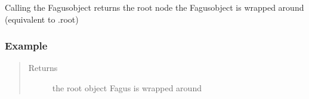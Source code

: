 \documentclass[a4paper,10pt,english]{sphinxmanual}
\begin{document}
\begin{fulllineitems}
\begin{fulllineitems}
\end{fulllineitems}


\begin{fulllineitems}
\label{\detokenize{fagus.fagus:fagus.fagus.Fagus.__call__}}
\pysigstartsignatures
{}
\pysigstopsignatures
\sphinxAtStartPar
Calling the Fagus\sphinxhyphen{}object returns the root node the Fagus\sphinxhyphen{}object is wrapped around (equivalent to .root)
\subsubsection*{Example}

\begin{sphinxVerbatim}[commandchars=\\\{\}]
   
   
  
\end{sphinxVerbatim}
\begin{quote}\begin{description}
\item[{Returns}] \leavevmode
\sphinxAtStartPar
the root object Fagus is wrapped around

\end{description}\end{quote}

\end{fulllineitems}



\end{fulllineitems}
\end{document}

